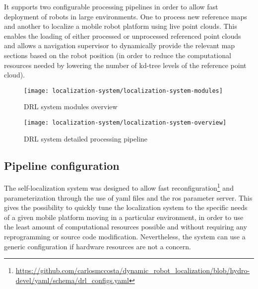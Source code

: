 It supports two configurable processing pipelines in order to allow fast deployment of robots in large environments. One to process new reference maps and another to localize a mobile robot platform using live point clouds. This enables the loading of either processed or unprocessed referenced point clouds and allows a navigation supervisor to dynamically provide the relevant map sections based on the robot position (in order to reduce the computational resources needed by lowering the number of kd-tree levels of the reference point cloud).

\begin{figure}[h]
	\centering
	\texttt{[image: localization-system/localization-system-modules]}
	\caption{DRL system modules overview}
	\label{fig:localization-system_localization-system-brief-overview}
\end{figure}

\begin{figure}[h]
	\centering
	\texttt{[image: localization-system/localization-system-overview]}
	\caption{DRL system detailed processing pipeline}
	\label{fig:localization-system_localization-system-overview}
\end{figure}


\subsection{Pipeline configuration}

The self-localization system was designed to allow fast reconfiguration\footnote{\url{https://github.com/carlosmccosta/dynamic_robot_localization/blob/hydro-devel/yaml/schema/drl_configs.yaml}} and parameterization through the use of yaml files and the \gls{ros} parameter server. This gives the possibility to quickly tune the localization system to the specific needs of a given mobile platform moving in a particular environment, in order to use the least amount of computational resources possible and without requiring any reprogramming or source code modification. Nevertheless, the system can use a generic configuration if hardware resources are not a concern.

